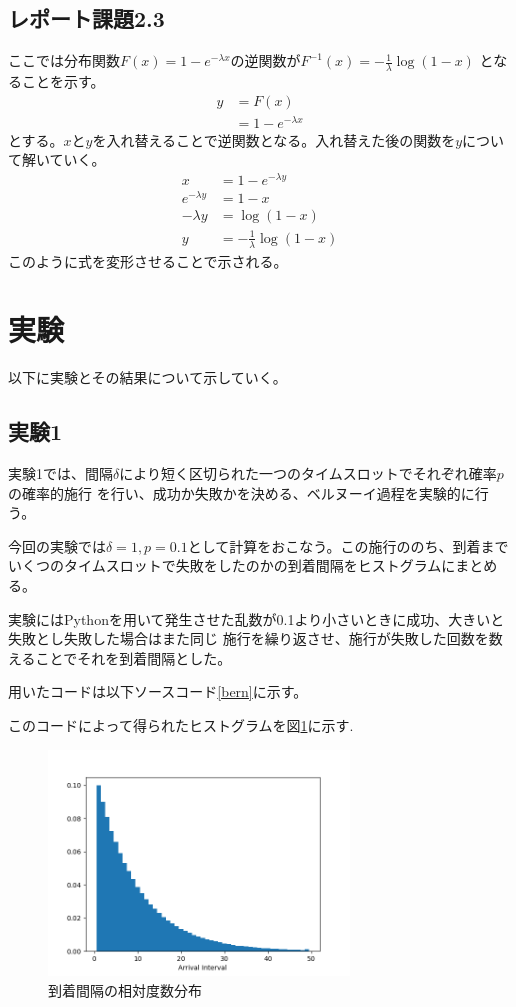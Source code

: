 \documentclass[a4paper,11pt,dvipdfmx]{jsarticle}
\begin{document}
\subsection{レポート課題2.3}
ここでは分布関数$F(x)=1-e^{-\lambda x}$の逆関数が$F^{-1}(x)=-\frac{1}{\lambda}\log(1-x)$
となることを示す。
\begin{align}
    y &= F(x) \\
      &= 1-e^{-\lambda x}
\end{align}
とする。$x$と$y$を入れ替えることで逆関数となる。入れ替えた後の関数を$y$について解いていく。
\begin{align}
    x &= 1 - e^{-\lambda y} \\
    e^{-\lambda y}  &= 1 - x \\
    -\lambda y &= \log(1-x) \\
    y &= -\frac{1}{\lambda}\log(1-x)
\end{align}
このように式を変形させることで示される。


\section{実験}
以下に実験とその結果について示していく。

\subsection{実験1}
実験1では、間隔$\delta$により短く区切られた一つのタイムスロットでそれぞれ確率$p$の確率的施行
を行い、成功か失敗かを決める、ベルヌーイ過程を実験的に行う。

今回の実験では$\delta=1,p=0.1$として計算をおこなう。この施行ののち、到着まで
いくつのタイムスロットで失敗をしたのかの到着間隔をヒストグラムにまとめる。

実験にはPythonを用いて発生させた乱数が0.1より小さいときに成功、大きいと失敗とし失敗した場合はまた同じ
施行を繰り返させ、施行が失敗した回数を数えることでそれを到着間隔とした。

用いたコードは以下ソースコード\ref{bern}に示す。


このコードによって得られたヒストグラムを図\ref{berhist}に示す.
\begin{figure}[h]
\centering
\includegraphics[width=80mm]{Bernoulli.png}
\caption{到着間隔の相対度数分布}
\label{berhist}
\end{figure}
\end{document}
